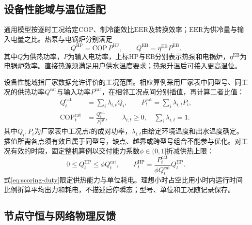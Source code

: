 \subsection{设备性能域与温位适配}

通用模型按逐时工况给定$\mathrm{COP}$、制冷能效比$\mathrm{EER}$及转换效率；$\mathrm{EER}$为供冷量与输入电量之比。热泵与电锅炉分别满足
\begin{equation}
Q^{\mathrm{HP}}=\mathrm{COP}\,P^{\mathrm{HP}},\qquad
Q^{\mathrm{EB}}=\eta^{\mathrm{EB}}P^{\mathrm{EB}} .
\label{eq:scoring-conversion}
\end{equation}
其中$Q$为供热功率，$P$为输入电功率，上标$\mathrm{HP}$与$\mathrm{EB}$分别表示热泵和电锅炉，$\eta^{\mathrm{EB}}$为电锅炉效率。直接热源须满足用户供水温度要求；热泵升温后可接入更高温位。

设备性能域指厂家数据允许评价的工况范围。相应算例采用厂家表中同型号、同工况的供热功率$Q^{\mathrm{cat}}$与输入功率$P^{\mathrm{cat}}$，在相邻工况点间分别插值，再计算二者比值：
\begin{equation}
\begin{aligned}
Q_t^{\mathrm{cat}}&=\sum_i\lambda_{i,t}Q_i,\qquad
P_t^{\mathrm{cat}}=\sum_i\lambda_{i,t}P_i,\\
\mathrm{COP}_t^{\mathrm{cat}}&=\frac{Q_t^{\mathrm{cat}}}{P_t^{\mathrm{cat}}},\qquad
\lambda_{i,t}\geq0,\quad \sum_i\lambda_{i,t}=1 .
\end{aligned}
\label{eq:scoring-performance}
\end{equation}
其中$Q_i,P_i$为厂家表中工况点$i$的成对功率，$\lambda_{i,t}$由给定环境温度和出水温度确定。插值所需各点须有效且属于同型号，缺点、越界或跨型号组合不能参与优化。对工况有效的时段，固定整机算例以交付能力系数$\phi\in(0,1]$折减供热上限：
\begin{equation}
0\leq Q_t^{\mathrm{HP}}\leq\phi Q_t^{\mathrm{cat}},\qquad
P_t^{\mathrm{HP}}=
\frac{P_t^{\mathrm{cat}}}{\phi Q_t^{\mathrm{cat}}}Q_t^{\mathrm{HP}} .
\label{eq:scoring-duty}
\end{equation}
式\eqref{eq:scoring-duty}限定供热能力与单位耗电。理想小时占空比用小时内运行时间比例折算平均出力和耗电，不描述启停瞬态；型号、单位和工况随记录保存。

\subsection{节点守恒与网络物理反馈}

